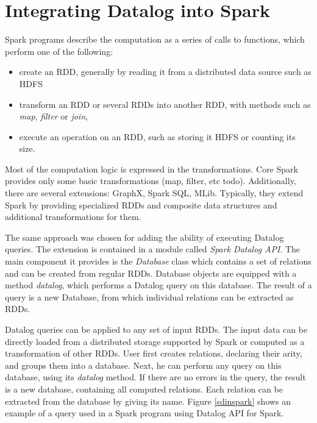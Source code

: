 \section{Integrating Datalog into Spark}

Spark programs describe the computation as a series of calls to functions, which perform one of the following:
\begin{itemize}
  \item create an RDD, generally by reading it from a distributed data source such as HDFS
  \item transform an RDD or several RDDs into another RDD, with methods such as \emph{map}, \emph{filter} or \emph{join},
  \item execute an operation on an RDD, such as storing it HDFS or counting its size.
\end{itemize}

Most of the computation logic is expressed in the transformations.  Core Spark provides only some basic transformations (map, filter, etc todo). Additionally, there are several extensions: GraphX, Spark SQL, MLib. Typically, they extend Spark by providing specialized RDDs and composite data structures and additional transformations for them.

The same approach was chosen for adding the ability of executing Datalog queries. The extension is contained in a module called \emph{Spark Datalog API}. The main component it provides is the \emph{Database} class which contains a set of relations and can be created from regular RDDs. Database objects are equipped with a method \emph{datalog}, which performs a Datalog query on this database. The result of a query is a new Database, from which individual relations can be extracted as RDDs. 

Datalog queries can be applied to any set of input RDDs. The input data can be directly loaded from a distributed storage supported by Spark or computed as a transformation of other RDDs. User first creates relations, declaring their arity, and groups them into a database. Next, he can perform any query on this database, using its \emph{datalog} method. If there are no errors in the query, the result is a new database, containing all computed relations. Each relation can be extracted from the database by giving its name. Figure \ref{sdinspark} shows an example of a \datalogra query used in a Spark program using Datalog API for Spark.

